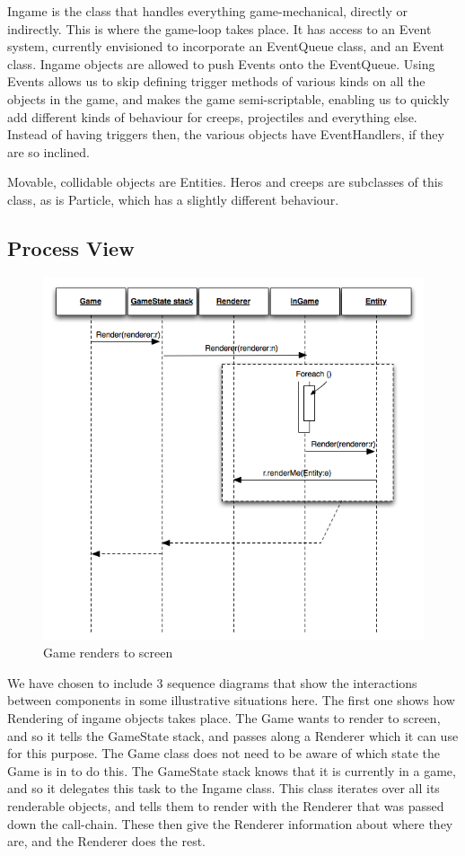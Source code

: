 Ingame is the class that handles everything game-mechanical, directly or
indirectly. This is where the game-loop takes place. It has access to an Event
system, currently envisioned to incorporate an EventQueue class, and an Event
class. Ingame objects are allowed to push Events onto the EventQueue. Using
Events allows us to skip defining trigger methods of various kinds on all the
objects in the game, and makes the game semi-scriptable, enabling us to quickly
add different kinds of behaviour for creeps, projectiles and everything else.
Instead of having triggers then, the various objects have EventHandlers, if
they are so inclined.

Movable, collidable objects are Entities. Heros and creeps are subclasses
of this class, as is Particle, which has a slightly different behaviour.
\subsection{Process View}

\begin{figure}[H]
	\begin{center}
		\includegraphics[scale=0.75]{graphics/GameRendersToScreen}
	\end{center}
        \caption{Game renders to screen}
\end{figure}

We have chosen to include 3 sequence diagrams that show the interactions between
components in some illustrative situations here. The first one shows how Rendering
of ingame objects takes place. The Game wants to render to screen, and so it
tells the GameState stack, and passes along a Renderer which it can use for this
purpose. The Game class does not need to be aware of which state the Game is in
to do this. The GameState stack knows that it is currently in a game, and so
it delegates this task to the Ingame class. This class iterates over all its
renderable objects, and tells them to render with the Renderer that was passed
down the call-chain. These then give the Renderer information about where they
are, and the Renderer does the rest.

